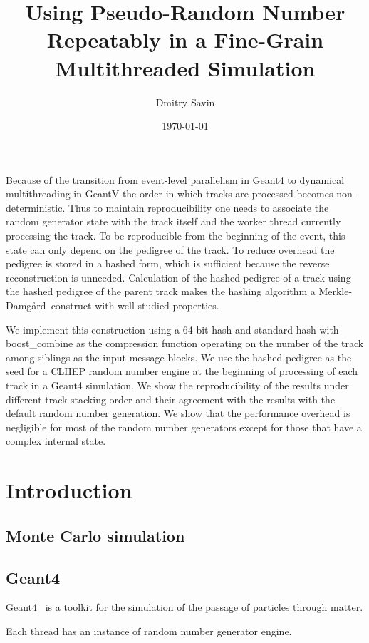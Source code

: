 \documentclass[a4paper, titlepage, 12pt]{article} %
\title{Using Pseudo-Random Number Repeatably in a Fine-Grain Multithreaded Simulation}
\author{Dmitry Savin}
\date{\today}
\newcommand{\MD}{Merkle-Damg\r{a}rd}
\begin{document}
 \maketitle
 
 \abstract
  Because of the transition from event-level parallelism in Geant4 to dynamical multithreading in GeantV the order in which tracks are processed becomes non-deterministic.
  Thus to maintain reproducibility one needs to associate the random generator state with the track itself and the worker thread currently processing the track.
  To be reproducible from the beginning of the event, this state can only depend on the pedigree of the track.
  To reduce overhead the pedigree is stored in a hashed form, which is sufficient because the reverse reconstruction is unneeded.
  Calculation of the hashed pedigree of a track using the hashed pedigree of the parent track makes the hashing algorithm a \MD\ construct with well-studied properties.
  
  We implement this construction using a 64-bit hash and standard hash with boost\_combine as the compression function operating on the number of the track among siblings as the input message blocks.
  We use the hashed pedigree as the seed for a CLHEP random number engine at the beginning of processing of each track in a Geant4 simulation.
  We show the reproducibility of the results under different track stacking order and their agreement with the results with the default random number generation.
  We show that the performance overhead is negligible for most of the random number generators except for those that have a complex internal state.
  
 \newpage
 \tableofcontents
 \newpage
  
 \section{Introduction}
  \subsection{Monte Carlo simulation}
  \subsection{Geant4}
   Geant4~\cite{AGOSTINELLI2003250, 1610988, ALLISON2016186} is a toolkit for the simulation of the passage of particles through matter.
   
   
   \cite{GEANT4-MT}
   Each thread has an instance of random number generator engine.
   
\end{document}
